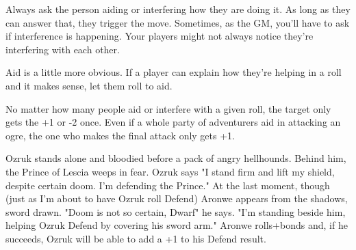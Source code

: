        

Always ask the person aiding or interfering how they are doing it. As long as they can answer that, they trigger the move. Sometimes, as the GM, you'll have to ask if interference is happening. Your players might not always notice they're interfering with each other.

       

Aid is a little more obvious. If a player can explain how they're helping in a roll and it makes sense, let them roll to aid.

       

No matter how many people aid or interfere with a given roll, the target only gets the +1 or -2 once. Even if a whole party of adventurers aid in attacking an ogre, the one who makes the final attack only gets +1.

       
\startExample
Ozruk stands alone and bloodied before a pack of angry hellhounds. Behind him, the Prince of Lescia weeps in fear. Ozruk says "I stand firm and lift my shield, despite certain doom. I'm defending the Prince." At the last moment, though (just as I'm about to have Ozruk roll Defend) Aronwe appears from the shadows, sword drawn. "Doom is not so certain, Dwarf" he says. "I'm standing beside him, helping Ozruk Defend by covering his sword arm." Aronwe rolls+bonds and, if he succeeds, Ozruk will be able to add a +1 to his Defend result.
\stopExample
       
